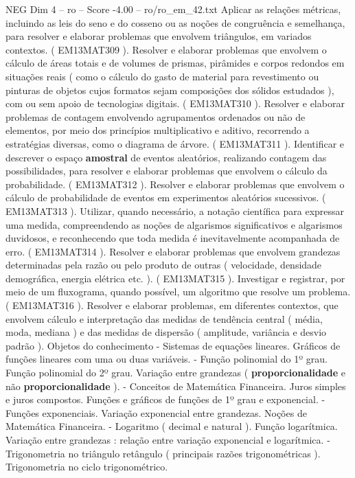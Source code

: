 \begin{textsample}{NEG Dim 4 – ro – Score -4.00 – ro/ro\_em\_42.txt}
Aplicar as relações métricas, incluindo as leis do seno e do cosseno ou as noções de congruência e semelhança, para resolver e elaborar problemas que envolvem triângulos, em variados contextos. ( EM13MAT309 ).
Resolver e elaborar problemas que envolvem o cálculo de áreas totais e de volumes de prismas, pirâmides e corpos redondos em situações reais ( como o cálculo do gasto de material para revestimento ou pinturas de objetos cujos formatos sejam composições dos sólidos estudados ), com ou sem apoio de tecnologias digitais. ( EM13MAT310 ).
Resolver e elaborar problemas de contagem envolvendo agrupamentos ordenados ou não de elementos, por meio dos princípios multiplicativo e aditivo, recorrendo a estratégias diversas, como o diagrama de árvore. ( EM13MAT311 ).
Identificar e descrever o espaço \textbf{amostral} de eventos aleatórios, realizando contagem das possibilidades, para resolver e elaborar problemas que envolvem o cálculo da probabilidade. ( EM13MAT312 ).
Resolver e elaborar problemas que envolvem o cálculo de probabilidade de eventos em experimentos aleatórios sucessivos. ( EM13MAT313 ).
Utilizar, quando necessário, a notação científica para expressar uma medida, compreendendo as noções de algarismos significativos e algarismos duvidosos, e reconhecendo que toda medida é inevitavelmente acompanhada de erro. ( EM13MAT314 ).
Resolver e elaborar problemas que envolvem grandezas determinadas pela razão ou pelo produto de outras ( velocidade, densidade demográfica, energia elétrica etc. ). ( EM13MAT315 ).
Investigar e registrar, por meio de um fluxograma, quando possível, um algoritmo que resolve um problema. ( EM13MAT316 ).
Resolver e elaborar problemas, em diferentes contextos, que envolvem cálculo e interpretação das medidas de tendência central ( média, moda, mediana ) e das medidas de dispersão ( amplitude, variância e desvio padrão ).
Objetos do conhecimento - Sistemas de equações lineares.
Gráficos de funções lineares com uma ou duas variáveis. - Função polinomial do 1º grau.
Função polinomial do 2º grau.
Variação entre grandezas ( \textbf{proporcionalidade} e não \textbf{proporcionalidade} ). - Conceitos de Matemática Financeira.
Juros simples e juros compostos.
Funções e gráficos de funções de 1º grau e exponencial. - Funções exponenciais.
Variação exponencial entre grandezas.
Noções de Matemática Financeira. - Logaritmo ( decimal e natural ).
Função logarítmica.
Variação entre grandezas : relação entre variação exponencial e logarítmica. - Trigonometria no triângulo retângulo ( principais razões trigonométricas ).
Trigonometria no ciclo trigonométrico.

\end{textsample}
